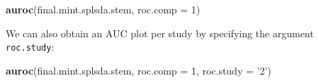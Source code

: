 \documentclass[]{book}
\newenvironment{Shaded}{\begin{snugshade}}{\end{snugshade}}
\newcommand{\DataTypeTok}[1]{\textcolor[rgb]{0.13,0.29,0.53}{#1}}
\newcommand{\DecValTok}[1]{\textcolor[rgb]{0.00,0.00,0.81}{#1}}
\newcommand{\KeywordTok}[1]{\textcolor[rgb]{0.13,0.29,0.53}{\textbf{#1}}}
\newcommand{\NormalTok}[1]{#1}
\newcommand{\StringTok}[1]{\textcolor[rgb]{0.31,0.60,0.02}{#1}}
\begin{document}
\begin{Shaded}
\begin{Highlighting}[]
\KeywordTok{auroc}\NormalTok{(final.mint.splsda.stem, }\DataTypeTok{roc.comp =} \DecValTok{1}\NormalTok{)}
\end{Highlighting}
\end{Shaded}

We can also obtain an AUC plot per study by specifying the argument \texttt{roc.study}:

\begin{Shaded}
\begin{Highlighting}[]
\KeywordTok{auroc}\NormalTok{(final.mint.splsda.stem, }\DataTypeTok{roc.comp =} \DecValTok{1}\NormalTok{, }\DataTypeTok{roc.study =} \StringTok{'2'}\NormalTok{)}
\end{Highlighting}
\end{Shaded}
\end{document}
